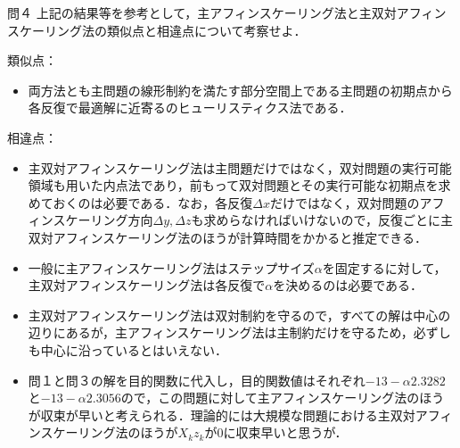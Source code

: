 \documentclass[a4paper,11pt]{jsarticle}
\numberwithin{theorem}{section}  %
\numberwithin{equation}{section} %
\begin{document}
\begin{itembox}[l]{問４}
上記の結果等を参考として，主アフィンスケーリング法と主双対アフィンスケーリング法の類似点と相違点について考察せよ．
\end{itembox}
類似点：
\begin{itemize}
\item 両方法とも主問題の線形制約を満たす部分空間上である主問題の初期点から各反復で最適解に近寄るのヒューリスティクス法である．
\end{itemize}
相違点：
\begin{itemize}
\item 主双対アフィンスケーリング法は主問題だけではなく，双対問題の実行可能領域も用いた内点法であり，前もって双対問題とその実行可能な初期点を求めておくのは必要である．なお，各反復$\Delta x$だけではなく，双対問題のアフィンスケーリング方向$\Delta y,\Delta z$も求めらなければいけないので，反復ごとに主双対アフィンスケーリング法のほうが計算時間をかかると推定できる．
\item 一般に主アフィンスケーリング法はステップサイズ$\alpha$を固定するに対して，主双対アフィンスケーリング法は各反復で$\alpha$を決めるのは必要である．
\item 主双対アフィンスケーリング法は双対制約を守るので，すべての解は中心の辺りにあるが，主アフィンスケーリング法は主制約だけを守るため，必ずしも中心に沿っているとはいえない．
\item $問１$と$問３$の解を目的関数に代入し，目的関数値はそれぞれ$-13-\alpha 2.3282 $と$-13-\alpha2.3056$ので，この問題に対して主アフィンスケーリング法のほうが収束が早いと考えられる．理論的には大規模な問題における主双対アフィンスケーリング法のほうが$X_kz_k$が$0$に収束早いと思うが．
\end{itemize}
\end{document}
